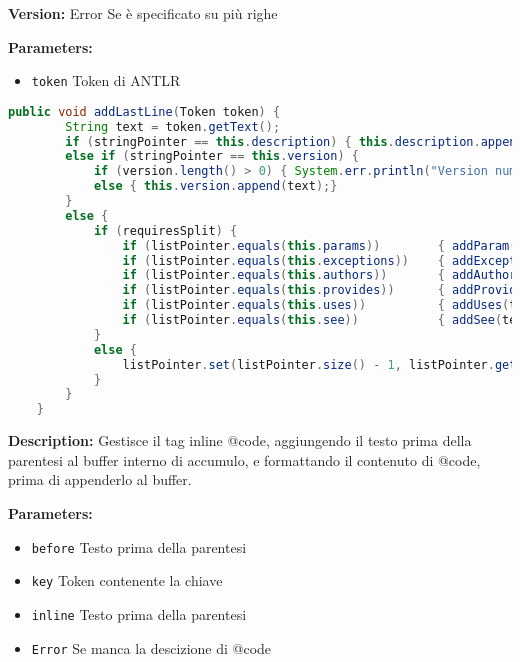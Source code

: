 \documentclass{article}
\makeatletter
\newcommand\atsign{@}
\makeatother
\begin{document}
\textbf{Version:} Error Se è specificato su più righe

\textbf{Parameters:}
\begin{itemize}
  \item\texttt{token} Token di ANTLR  
\end{itemize}

\begin{lstlisting}[language=Java]
    public void addLastLine(Token token) {
        String text = token.getText();
        if (stringPointer == this.description) { this.description.append(text); }
        else if (stringPointer == this.version) {
            if (version.length() > 0) { System.err.println("Version number must be specified on a single line at line " + token.getLine()); }
            else { this.version.append(text);}
        }
        else {
            if (requiresSplit) {
                if (listPointer.equals(this.params))        { addParam(text); }
                if (listPointer.equals(this.exceptions))    { addException(text); }
                if (listPointer.equals(this.authors))       { addAuthor(text); }
                if (listPointer.equals(this.provides))      { addProvides(text); }
                if (listPointer.equals(this.uses))          { addUses(text); }
                if (listPointer.equals(this.see))           { addSee(text); }
            }
            else {
                listPointer.set(listPointer.size() - 1, listPointer.get(listPointer.size() - 1).concat(" " + text));
            }
        }
    }
\end{lstlisting}
\textbf{Description:}  Gestisce il tag inline \atsign code, aggiungendo il testo prima della parentesi al buffer interno di accumulo, e formattando il contenuto di \atsign code, prima di appenderlo al buffer.  

\textbf{Parameters:}
\begin{itemize}
  \item\texttt{before} Testo prima della parentesi 
  \item\texttt{key} Token contenente la chiave 
  \item\texttt{inline} Testo prima della parentesi  
  \item\texttt{Error} Se manca la descizione di \atsign code
\end{itemize}
\end{document}
